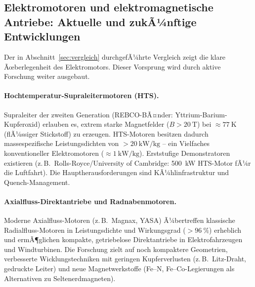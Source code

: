 ﻿\documentclass[12pt, a4paper]{report}
\theoremstyle{definition}
\theoremstyle{remark}
\begin{document}
\subsection{Elektromotoren und elektromagnetische Antriebe: Aktuelle und
               zukÃ¼nftige Entwicklungen}

Der in Abschnitt~\ref{sec:vergleich} durchgefÃ¼hrte Vergleich zeigt die klare
Ãœberlegenheit des Elektromotors. Dieser Vorsprung wird durch aktive Forschung
weiter ausgebaut.

\paragraph{Hochtemperatur-Supraleitermotoren (HTS).}
Supraleiter der zweiten Generation (REBCO-BÃ¤nder: Yttrium-Barium-Kupferoxid)
erlauben es, extrem starke Magnetfelder ($B > \SI{20}{\tesla}$) bei $\approx
\SI{77}{\kelvin}$ (flÃ¼ssiger Stickstoff) zu erzeugen. HTS-Motoren besitzen
dadurch massespezifische Leistungsdichten von $>\SI{20}{\kilo\watt\per\kilogram}$
-- ein Vielfaches konventioneller Elektromotoren ($\approx \SI{1}{\kilo\watt\per\kilogram}$).
Erststufige Demonstratoren existieren (z.\,B.\ Rolls-Royce/University of
Cambridge: \SI{500}{\kilo\watt} HTS-Motor fÃ¼r die Luftfahrt). Die Hauptherausforderungen
sind KÃ¼hlinfrastruktur und Quench-Management.

\paragraph{Axialfluss-Direktantriebe und Radnabenmotoren.}
Moderne Axialfluss-Motoren (z.\,B.\ Magnax, YASA) Ã¼bertreffen klassische
Radialfluss-Motoren in Leistungsdichte und Wirkungsgrad ($>\SI{96}{\percent}$)
erheblich und ermÃ¶glichen kompakte, getriebelose Direktantriebe in
Elektrofahrzeugen und Windturbinen. Die Forschung zielt auf noch kompaktere
Geometrien, verbesserte Wicklungstechniken mit geringen Kupferverlusten
(z.\,B.\ Litz-Draht, gedruckte Leiter) und neue Magnetwerkstoffe
(Fe--N, Fe--Co-Legierungen als Alternativen zu Seltenerdmagneten).
\end{document}
